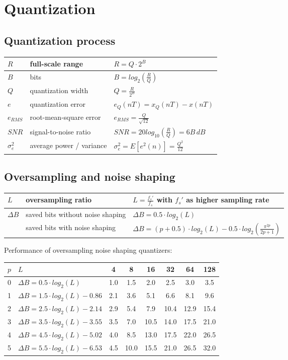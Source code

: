 \section{Quantization}

\subsection{Quantization process}
\begin{tabular}{|l|l|l|}
	\hline
	$R$			& full-scale range		& $R = Q \cdot 2^B$
	\\ \hline
	$B$			& bits					& $B = log_2(\frac{R}{Q})$
	\\ \hline
	$Q$			& quantization width	& $Q = \frac{R}{2^B}$
	\\ \hline
	$e$			& quantization error	& $e_Q(nT) = x_Q(nT) -x(nT)$
	\\ \hline
	$e_{RMS}$	& root-mean-square error & $e_{RMS} = \frac{Q}{\sqrt{12}}$
	\\ \hline
	$SNR$		& signal-to-noise ratio	& $SNR = 20 log_{10}(\frac{R}{Q}) = 6B\, dB$
	\\ \hline
	$\sigma_e^2$& average power / variance & $\sigma_e^2 = E[e^2(n)] = \frac{Q^2}{12}$
	\\ \hline
\end{tabular}


\subsection{Oversampling and noise shaping}
\begin{tabular}{|l|l|l|}
	\hline
	$L$	& oversampling ratio	& $L = \frac{f_s'}{f_s}$ with $f_s'$ as higher sampling rate
	\\ \hline
	$\Delta B$	& saved bits without noise shaping	& $\Delta B = 0.5 \cdot log_2(L)$ \\
				& saved bits with noise shaping		& $\Delta B = (p + 0.5) \cdot log_2(L) - 0.5 \cdot log_2(\frac{\pi^{2p}}{2p + 1})$
	\\ \hline
\end{tabular}

Performance of oversampling noise shaping quantizers:

\begin{tabular}{|c|l|c|c|c|c|c|c|}
	\hline
	$p$	& $L$							& 4		& 8		& 16	& 32	& 64	& 128
	\\ \hline
	0	& $\Delta B =0.5 \cdot log_2(L)$		& 1.0	& 1.5	& 2.0	& 2.5	& 3.0	& 3.5 \\
	1	& $\Delta B =1.5 \cdot log_2(L) - 0.86$ & 2.1	& 3.6	& 5.1	& 6.6	& 8.1	& 9.6 \\
	2	& $\Delta B =2.5 \cdot log_2(L) - 2.14$	& 2.9	& 5.4	& 7.9	& 10.4	& 12.9	& 15.4 \\
	3	& $\Delta B =3.5 \cdot log_2(L) - 3.55$	& 3.5	& 7.0	& 10.5	& 14.0	& 17.5	& 21.0 \\
	4	& $\Delta B =4.5 \cdot log_2(L) - 5.02$	& 4.0	& 8.5	& 13.0	& 17.5	& 22.0	& 26.5 \\
	5	& $\Delta B =5.5 \cdot log_2(L) - 6.53$	& 4.5	& 10.0	& 15.5	& 21.0	& 26.5	& 32.0 \\
	\hline
\end{tabular}
\resetArrayStretch


